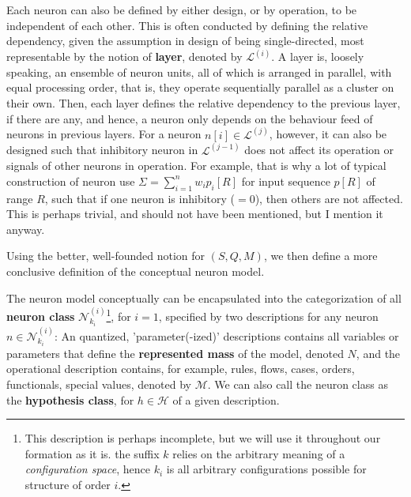 Each neuron can also be defined by either design, or by operation, to be independent of each other. This is often conducted by defining the relative dependency, given the assumption in design of being single-directed, most representable by the notion of \textbf{layer}, denoted by $\mathcal{L}^{(i)}$. A layer is, loosely speaking, an ensemble of neuron units, all of which is arranged in parallel, with equal processing order, that is, they operate sequentially parallel as a cluster on their own. Then, each layer defines the relative dependency to the previous layer, if there are any, and hence, a neuron only depends on the behaviour feed of neurons in previous layers. For a neuron $n[i]\in \mathcal{L}^{(j)}$, however, it can also be designed such that inhibitory neuron in $\mathcal{L}^{(j-1)}$ does not affect its operation or signals of other neurons in operation. For example, that is why a lot of typical construction of neuron use $\Sigma = \sum_{i=1}^{n} w_{i}p_{i}[R]$ for input sequence $p[R]$ of range $R$, such that if one neuron is inhibitory ($=0$), then others are not affected. This is perhaps trivial, and should not have been mentioned, but I mention it anyway. 

Using the better, well-founded notion for $(S,Q,M)$, we then define a more conclusive definition of the conceptual neuron model. 
\begin{definition}
    The neuron model conceptually can be encapsulated into the categorization of all \textbf{neuron class} $\mathcal{N}_{k_{i}}^{(i)}$\footnote{This description is perhaps incomplete, but we will use it throughout our formation as it is. the suffix $k$ relies on the arbitrary meaning of a \textit{configuration space}, hence $k_i$ is all arbitrary configurations possible for structure of order $i$.}, for $i=1$, specified by two descriptions for any neuron $n\in \mathcal{N}_{k_{i}}^{(i)}$: An quantized, 'parameter(-ized)' descriptions contains all variables or parameters that define the \textbf{represented mass} of the model, denoted $N$, and the operational description contains, for example, rules, flows, cases, orders, functionals, special values, denoted by $\mathcal{M}$. We can also call the neuron class as the \textbf{hypothesis class}, for $h\in \mathcal{H}$ of a given description.
    \label{def:neuron_class_model}
\end{definition}

